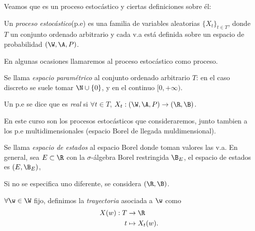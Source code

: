 Veamos que es un proceso estocástico y ciertas definiciones sobre él:

\begin{ndef}
  Un \emph{proceso estocástico}(p.e) es una familia de variables aleatorias ${\{X_t\}}_{t \in T}$, donde $T$ un conjunto ordenado arbitrario y cada v.a está definida sobre un espacio de probabilidad $(\W, \A, P)$.
\end{ndef}

\begin{nota}
  En algunas ocasiones llamaremos al proceso estocástico como proceso.
\end{nota}

\begin{ndef}
  Se llama \emph{espacio paramétrico} al conjunto ordenado arbitrario $T$: en el caso discreto se suele tomar $\N \cup \{0\}$, y en el continuo $[0, +\infty)$.
\end{ndef}

\begin{ndef}
  Un p.e se dice que es \emph{real} si $\forall t \in T$, $X_t : (\W, \A, P) \to (\R, \B)$.
\end{ndef}

\begin{nota}
  En este curso son los procesos estocásticos que consideraremos, junto tambien a los p.e multidimensionales (espacio Borel de llegada muldimensional).
\end{nota}

\begin{ndef}
  Se llama \emph{espacio de estados} al espacio Borel donde toman valores las v.a. En general, sea $E \subset \R$ con la $\sigma$-álgebra Borel restringida $\B_E$, el espacio de estados es $(E, \B_E)$,
\end{ndef}

\begin{nota}
  Si no se especifica uno diferente, se considera $(\R, \B)$.
\end{nota}

\begin{ndef}[Trayectoria]
  $\forall \w \in \W$ fijo, definimos la \emph{trayectoria} asociada a $\w$ como
  \begin{align*}
    X(w): T & \to \R \\
    t & \mapsto X_t(w).
  \end{align*}
\end{ndef}

